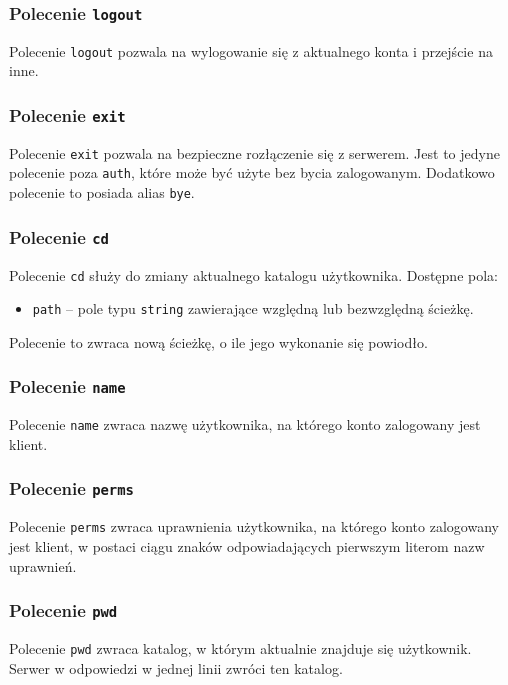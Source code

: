 \documentclass[8pt,a4paper]{article}
\begin{document}
\subsubsection{Polecenie \texttt{logout}}
Polecenie \texttt{logout} pozwala na wylogowanie się z aktualnego konta i przejście na inne.

\subsubsection{Polecenie \texttt{exit}}
Polecenie \texttt{exit} pozwala na bezpieczne rozłączenie się z serwerem. Jest to jedyne polecenie poza \texttt{auth}, które może być użyte bez bycia zalogowanym. Dodatkowo polecenie to posiada alias \texttt{bye}.

\subsubsection{Polecenie \texttt{cd}}
Polecenie \texttt{cd} służy do zmiany aktualnego katalogu użytkownika. Dostępne pola:
\begin{itemize}
    \item \texttt{path} -- pole typu \texttt{string} zawierające względną lub bezwzględną ścieżkę.
\end{itemize}
Polecenie to zwraca nową ścieżkę, o ile jego wykonanie się powiodło.

\subsubsection{Polecenie \texttt{name}}
Polecenie \texttt{name} zwraca nazwę użytkownika, na którego konto zalogowany jest klient.

\subsubsection{Polecenie \texttt{perms}}
Polecenie \texttt{perms} zwraca uprawnienia użytkownika, na którego konto zalogowany jest klient, w postaci ciągu znaków odpowiadających pierwszym literom nazw uprawnień.

\subsubsection{Polecenie \texttt{pwd}}
Polecenie \texttt{pwd} zwraca katalog, w którym aktualnie znajduje się użytkownik. Serwer w odpowiedzi w jednej linii zwróci ten katalog.
\end{document}
